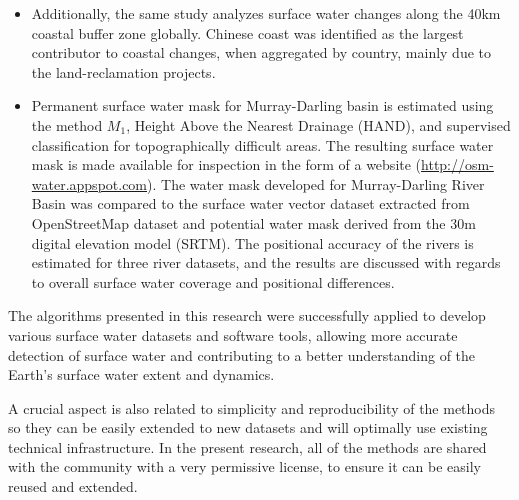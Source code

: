 \begin{itemize}
	\item Additionally, the same study analyzes surface water changes along the 40km coastal buffer zone globally. Chinese coast was identified as the largest contributor to coastal changes, when aggregated by country, mainly due to the land-reclamation projects.
	

	
	\item Permanent surface water mask for Murray-Darling basin is estimated using the method $M_1$, Height Above the Nearest Drainage (HAND), and supervised classification for topographically difficult areas. The resulting surface water mask is made available for inspection in the form of a website (\url{http://osm-water.appspot.com}). The water mask developed for Murray-Darling River Basin was compared to the surface water vector dataset extracted from OpenStreetMap dataset and potential water mask derived from the 30m digital elevation model (SRTM). The positional accuracy of the rivers is estimated for three river datasets, and the results are discussed with regards to overall surface water coverage and positional differences.    
\end{itemize}

The algorithms presented in this research were successfully applied to develop various surface water datasets and software tools, allowing more accurate detection of surface water and contributing to a better understanding of the Earth's surface water extent and dynamics.

A crucial aspect is also related to simplicity and reproducibility of the methods so they can be easily extended to new datasets and will optimally use existing technical infrastructure. In the present research, all of the methods are shared with the community with a very permissive license, to ensure it can be easily reused and extended.

